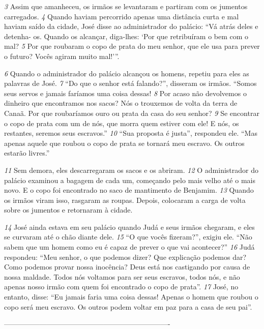 \bigskip   
\textit{\tiny 3}
Assim que amanheceu, os irmãos se levantaram e partiram com os jumentos
carregados. 
\textit{\tiny 4} 
Quando haviam percorrido apenas uma distância curta e mal haviam
saído da cidade, José disse ao administrador do palácio: “Vá atrás deles e detenha-
os. Quando os alcançar, diga-lhes: ‘Por que retribuíram o bem com o mal? 
\textit{\tiny 5} 
Por
que roubaram o copo de prata
 do meu senhor, que ele usa para prever o futuro?
Vocês agiram muito mal!’”. 

\bigskip   
\textit{\tiny 6}
Quando o administrador do palácio alcançou os homens, repetiu para eles as
palavras de José. 
\textit{\tiny 7}
“Do   que o senhor está falando?”, disseram os irmãos. “Somos seus servos e
jamais faríamos uma coisa dessas! 
\textit{\tiny 8}
Por acaso não devolvemos o dinheiro que
encontramos nos sacos? Nós o trouxemos de volta da terra de Canaã. Por que
roubaríamos ouro ou prata da casa do seu senhor? 
\textit{\tiny 9} 
Se encontrar o copo de prata
com um de nós, que morra quem estiver com ele! E nós, os restantes, seremos seus
escravos.”
\textit{\tiny 10}
“Sua proposta é justa”, respondeu ele. “Mas apenas aquele que roubou o copo
de prata se tornará meu escravo. Os outros estarão livres.”

\bigskip   
\textit{\tiny 11}
Sem demora, eles descarregaram os sacos e os abriram. 
\textit{\tiny 12}
O administrador
do palácio examinou a bagagem de cada um, começando pelo mais velho até o
mais novo. E o copo foi encontrado no saco de mantimento de Benjamim.
\textit{\tiny 13}
Quando os irmãos viram isso, rasgaram as roupas. Depois, colocaram a carga de
volta sobre os jumentos e retornaram à cidade.

\bigskip   
\textit{\tiny 14}
José ainda estava em seu palácio quando Judá e seus irmãos chegaram, e eles
se curvaram até o chão diante dele. 
\textit{\tiny 15}
“O que vocês fizeram?”, exigiu ele. “Não
sabem que um homem como eu é capaz de prever o que vai acontecer?”
\textit{\tiny 16}
Judá respondeu: “Meu senhor, o que podemos dizer? Que explicação
podemos dar? Como podemos provar nossa inocência? Deus está nos castigando
por causa de nossa maldade. Todos nós voltamos para ser seus escravos, todos
nós, e não apenas nosso irmão com quem foi encontrado o copo de prata”.
\textit{\tiny 17}
José, no entanto, disse: “Eu jamais faria uma coisa dessas! Apenas o homem
que roubou o copo será meu escravo. Os outros podem voltar em paz para a casa
de seu pai”.



----------------------------------------------------------------------
